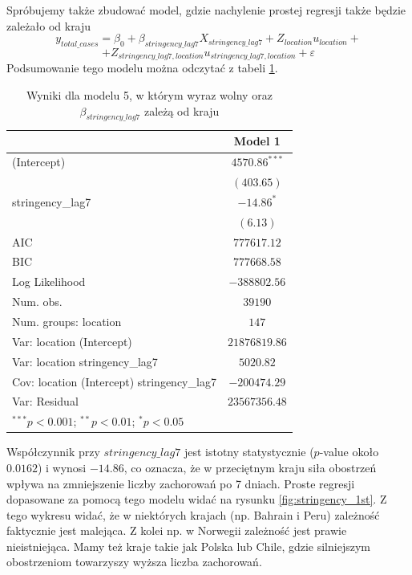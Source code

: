 \documentclass[12pt]{mwbk}
\theoremstyle{plain}
\theoremstyle{definition}
\theoremstyle{remark}
\begin{document}
Spróbujemy także zbudować model, gdzie nachylenie prostej regresji także będzie zależało od kraju
$$y_{total\_cases}=\beta_0+\beta_{stringency\_lag7} X_{stringency\_lag7}+Z_{location}u_{location}+$$$$+Z_{stringency\_lag7,location}u_{stringency\_lag7,location}+\varepsilon$$
Podsumowanie tego modelu można odczytać z tabeli \ref{table:mod5-slope}.
\begin{table}[!htpb]
	\begin{center}
		\begin{tabular}{l c}
			\hline
			& Model 1 \\
			\hline
			(Intercept)                                & $4570.86^{***}$ \\
			& $(403.65)$      \\
			stringency\_lag7                           & $-14.86^{*}$    \\
			& $(6.13)$        \\
			\hline
			AIC                                        & $777617.12$     \\
			BIC                                        & $777668.58$     \\
			Log Likelihood                             & $-388802.56$    \\
			Num. obs.                                  & $39190$         \\
			Num. groups: location                      & $147$           \\
			Var: location (Intercept)                  & $21876819.86$   \\
			Var: location stringency\_lag7             & $5020.82$       \\
			Cov: location (Intercept) stringency\_lag7 & $-200474.29$    \\
			Var: Residual                              & $23567356.48$   \\
			\hline
			\multicolumn{2}{l}{\scriptsize{$^{***}p<0.001$; $^{**}p<0.01$; $^{*}p<0.05$}}
		\end{tabular}
		\caption{Wyniki dla modelu 5, w którym wyraz wolny oraz $\beta_{stringency\_lag7}$ zależą od kraju}
		\label{table:mod5-slope}
	\end{center}
\end{table}
\newpage
Współczynnik przy $stringency\_lag7$ jest istotny statystycznie ($p$-value około $0.0162$) i wynosi $-14.86$, co oznacza, że w przeciętnym kraju siła obostrzeń wpływa na zmniejszenie liczby zachorowań po 7 dniach. Proste regresji dopasowane za pomocą tego modelu widać na rysunku \ref{fig:stringency_1st}. Z tego wykresu widać, że w niektórych krajach (np. Bahrain i Peru) zależność faktycznie jest malejąca. Z kolei np. w Norwegii zależność jest prawie nieistniejąca. Mamy też kraje takie jak Polska lub Chile, gdzie silniejszym obostrzeniom towarzyszy wyższa liczba zachorowań.
\end{document}
